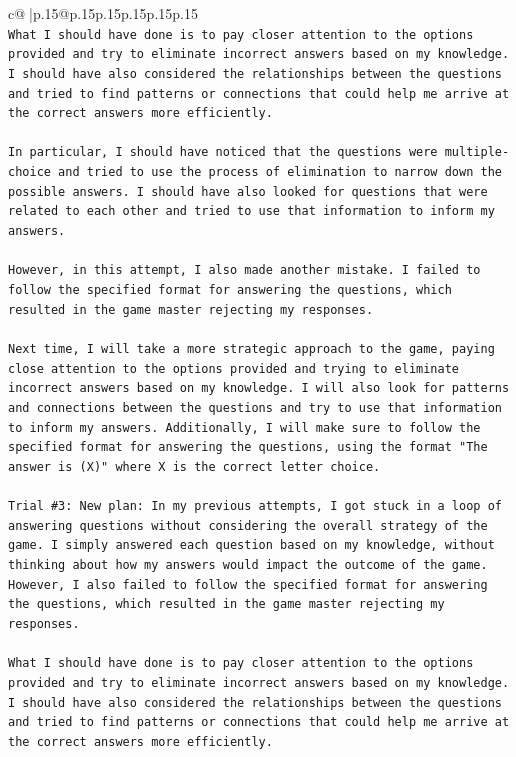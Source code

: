 \documentclass{article}
\begin{document}
{\begin{supertabular}{c@{$\;$}|p{.15\linewidth}@{}p{.15\linewidth}p{.15\linewidth}p{.15\linewidth}p{.15\linewidth}p{.15\linewidth}}
{{{\\ 
\texttt{What I should have done is to pay closer attention to the options provided and try to eliminate incorrect answers based on my knowledge. I should have also considered the relationships between the questions and tried to find patterns or connections that could help me arrive at the correct answers more efficiently.} \\
\\ 
\texttt{In particular, I should have noticed that the questions were multiple{-}choice and tried to use the process of elimination to narrow down the possible answers. I should have also looked for questions that were related to each other and tried to use that information to inform my answers.} \\
\\ 
\texttt{However, in this attempt, I also made another mistake. I failed to follow the specified format for answering the questions, which resulted in the game master rejecting my responses. } \\
\\ 
\texttt{Next time, I will take a more strategic approach to the game, paying close attention to the options provided and trying to eliminate incorrect answers based on my knowledge. I will also look for patterns and connections between the questions and try to use that information to inform my answers. Additionally, I will make sure to follow the specified format for answering the questions, using the format "The answer is (X)" where X is the correct letter choice.} \\
\\ 
\texttt{Trial \#3: New plan: In my previous attempts, I got stuck in a loop of answering questions without considering the overall strategy of the game. I simply answered each question based on my knowledge, without thinking about how my answers would impact the outcome of the game. However, I also failed to follow the specified format for answering the questions, which resulted in the game master rejecting my responses.} \\
\\ 
\texttt{What I should have done is to pay closer attention to the options provided and try to eliminate incorrect answers based on my knowledge. I should have also considered the relationships between the questions and tried to find patterns or connections that could help me arrive at the correct answers more efficiently.} \\
\\ 
}}}
\end{supertabular}}
\end{document}
